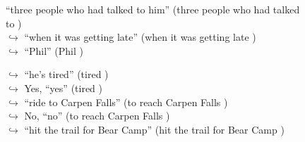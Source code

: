 \documentclass[11pt,a4paper, onecolumn]{article}
\begin{document}
\begin{figure}[t]
\begin{tcolorbox}[boxsep=0pt,left=5pt,right=0pt,top=2pt,colback = yellow!5]
\begin{dialogue}
{ ``three people who had talked to him'' (three people who had talked to ) }
\\
\colorbox{pink!25}{$\hookrightarrow$}
{ ``when it was getting late'' (when it was getting late ) }
\\
\colorbox{pink!25}{$\hookrightarrow$}
{ ``Phil'' (Phil ) }
\\
 \end{dialogue}\end{tcolorbox}\end{figure}\begin{figure}[t] \small \begin{tcolorbox}[boxsep=0pt,left=5pt,right=0pt,top=2pt,colback = yellow!5] \begin{dialogue}
 \small 
\colorbox{pink!25}{$\hookrightarrow$}
{ ``he's tired'' (tired ) }
\\
\colorbox{pink!25}{$\hookrightarrow$}
\colorbox{red!25}{Yes,}
{ ``yes'' (tired ) }
\\
\colorbox{pink!25}{$\hookrightarrow$}
{ ``ride to Carpen Falls'' (to reach Carpen Falls ) }
\\
\colorbox{pink!25}{$\hookrightarrow$}
\colorbox{red!25}{No,}
{ ``no'' (to reach Carpen Falls ) }
\\
\colorbox{pink!25}{$\hookrightarrow$}
{ ``hit the trail for Bear Camp'' (hit the trail for Bear Camp ) }
\\
 \end{dialogue}\end{tcolorbox}\end{figure}
\end{document}
